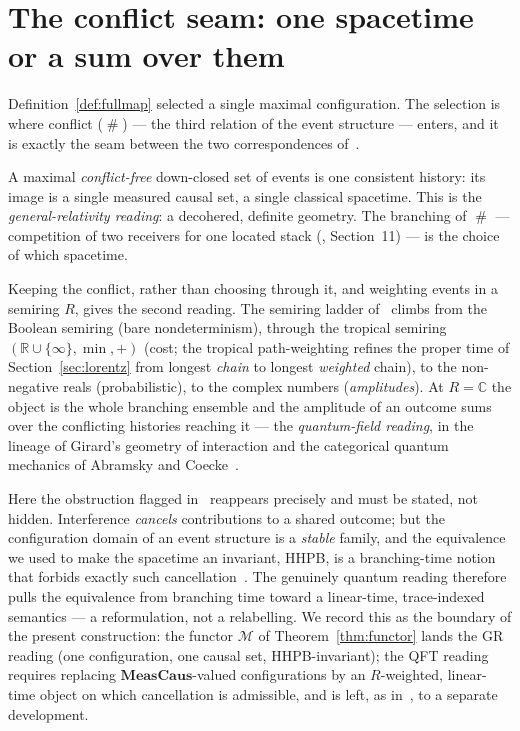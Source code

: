 \documentclass[11pt]{article}
\theoremstyle{definition}
\theoremstyle{plain}
\newcommand{\MeasCaus}{\mathbf{MeasCaus}}
\newcommand{\Map}{\mathcal{M}}
\newcommand{\confl}{\mathrel{\#}}                  %
\theoremstyle{remark}
\begin{document}
\section{The conflict seam: one spacetime or a sum over them}
\label{sec:conflict}

Definition~\ref{def:fullmap} selected a single maximal configuration.
The selection is where conflict ($\confl$) --- the third relation of the
event structure --- enters, and it is exactly the seam between the two
correspondences of~\cite{CostNote}.

A maximal \emph{conflict-free} down-closed set of events is one
consistent history: its image is a single measured causal set, a single
classical spacetime. This is the \emph{general-relativity reading}: a
decohered, definite geometry. The branching of $\confl$ --- competition
of two receivers for one located stack (\cite{CostNote}, Section~11) ---
is the choice of which spacetime.

Keeping the conflict, rather than choosing through it, and weighting
events in a semiring $R$, gives the second reading. The semiring ladder
of~\cite{CostNote} climbs from the Boolean semiring (bare
nondeterminism), through the tropical semiring $(\mathbb{R}\cup\{\infty\},
\min,+)$ (cost; the tropical path-weighting refines the proper time of
Section~\ref{sec:lorentz} from longest \emph{chain} to longest
\emph{weighted} chain), to the non-negative reals (probabilistic), to the
complex numbers (\emph{amplitudes}). At $R=\mathbb{C}$ the object is the
whole branching ensemble and the amplitude of an outcome sums over the
conflicting histories reaching it --- the \emph{quantum-field reading},
in the lineage of Girard's geometry of interaction and the categorical
quantum mechanics of Abramsky and Coecke~\cite{GirardGoI,AbramskyCoecke}.

Here the obstruction flagged in~\cite{CostNote} reappears precisely and
must be stated, not hidden. Interference \emph{cancels} contributions to
a shared outcome; but the configuration domain of an event structure is a
\emph{stable} family, and the equivalence we used to make the spacetime
an invariant, HHPB, is a branching-time notion that forbids exactly such
cancellation~\cite{vGG,WinskelNielsen}. The genuinely quantum reading
therefore pulls the equivalence from branching time toward a linear-time,
trace-indexed semantics --- a reformulation, not a relabelling. We
record this as the boundary of the present construction: the functor
$\Map$ of Theorem~\ref{thm:functor} lands the GR reading (one
configuration, one causal set, HHPB-invariant); the QFT reading requires
replacing $\MeasCaus$-valued configurations by an $R$-weighted,
linear-time object on which cancellation is admissible, and is left, as
in~\cite{CostNote}, to a separate development.
\end{document}

